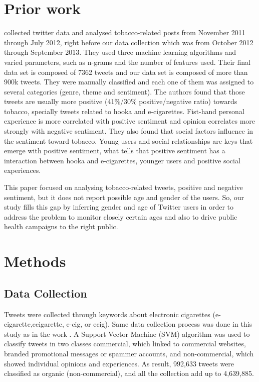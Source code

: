 \documentclass{sig-alternate}
\begin{document}
\section{Prior work}

\cite{myslin2013using} collected twitter data and analysed tobacco-related posts from November 2011 through July 2012, right before our data collection which was from October 2012 through September 2013. They used three machine learning algorithms and varied parameters, such as n-grams and the number of features used. Their final data set is composed of 7362 tweets and our data set is composed of more than 900k tweets. They were manually classified and each one of them was assigned to several categories (genre, theme and sentiment). The authors found that those tweets are usually more positive (41\%/30\% positive/negative ratio) towards tobacco, specially tweets related to hooka and e-cigarettes. Fist-hand personal experience is more correlated with positive sentiment and opinion correlates more strongly with negative sentiment. They also found that social factors influence in the sentiment toward tobacco. Young users and social relationships are keys that emerge with positive sentiment, what tells that positive sentiment has a interaction between hooka and e-cigarettes, younger users and positive social experiences. 

This paper focused on analysing tobacco-related tweets, positive and negative sentiment, but it does not report possible age and gender of the users. So, our study fills this gap by inferring gender and age of Twitter users in order to address the problem to monitor closely certain ages and also to drive public health campaigns to the right public.



\section{Methods}
\subsection{Data Collection}
\label{sec:data}
Tweets were collected through keywords about electronic cigarettes (e-cigarette,ecigarette, e-cig, or ecig). Same data collection process was done in this study as in the work \cite{huang2014cross}. A Support Vector Machine (SVM) algorithm was used to classify tweets in two classes commercial, which linked to commercial websites, branded promotional messages or spammer accounts, and non-commercial, which showed individual opinions and experiences. As result, 992,633 tweets were classified as organic (non-commercial), and all the collection add up to 4,639,885.
\end{document}
